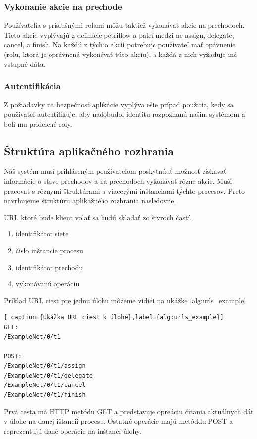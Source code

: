 \subsubsection{Vykonanie akcie na prechode} 
Používatelia s príslušnými rolami môžu taktiež vykonávať akcie na prechodoch. Tieto akcie vyplývajú z definície petriflow a patrí medzi ne assign, delegate, cancel, a finish. Na každú z týchto akcií potrebuje používateľ mať opávnenie (rolu, ktorá je oprávnená vykonávať túto akciu), a každá z nich vyžaduje iné vstupné dáta. 

\subsubsection{Autentifikácia} 
Z požiadavky na bezpečnosť aplikácie vyplýva ešte prípad použitia, kedy sa používateľ autentifikuje, aby nadobudol identitu rozpoznanú našim systémom a boli mu pridelené roly. 


\subsection{Štruktúra aplikačného rozhrania}
Náš systém musí prihláseným používateľom poskytnúuť možnosť získavať informácie o stave prechodov a na prechodoch vykonávať rôzne akcie. Muši pracovať s rôznymi štruktúrami a viacerými inštanciami týchto procesov. Preto navrhujeme štruktúru aplikažného rozhrania nasledovne.

URL ktoré bude klient volať sa budú skladať zo štyroch častí. 
\begin{enumerate}
	\item identifikátor siete
	\item čislo inštancie procesu
	\item identifikátor prechodu 
	\item vykonávanú operáciu
\end{enumerate}
Príklad URL ciest pre jednu úlohu môžeme vidieť na ukážke \ref{alg:urls_example}

\begin{lstlisting}[ caption={Ukážka URL ciest k úlohe},label={alg:urls_example}] 
GET:
/ExampleNet/0/t1

POST:
/ExampleNet/0/t1/assign
/ExampleNet/0/t1/delegate
/ExampleNet/0/t1/cancel
/ExampleNet/0/t1/finish
\end{lstlisting} 

Prvá cesta má HTTP metódu GET a predstavuje opreáciu čítania aktuálnych dát v úlohe na danej ištancií procesu. Ostatné operácie majú metóddu POST a reprezentujú dané operácie na inštancí úlohy.

